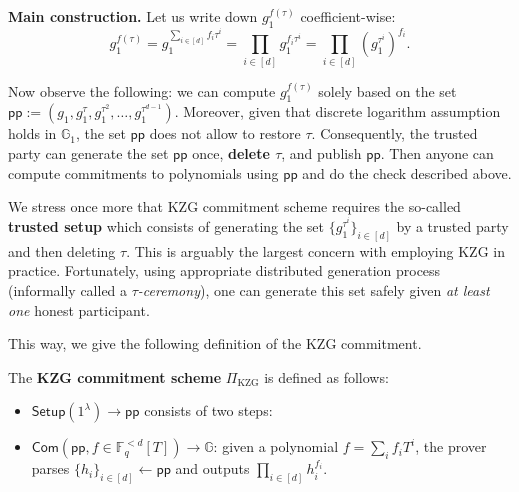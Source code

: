\documentclass[../../book]{subfiles}
\begin{document}
\textbf{Main construction.} Let us write down $g_1^{f(\tau)}$ coefficient-wise:
\begin{equation*}
    g_1^{f(\tau)} = g_1^{\sum_{i \in [d]}f_i\tau^i} = \prod_{i \in [d]}g_1^{f_i\tau^i} = \prod_{i \in [d]}(g_1^{\tau^i})^{f_i}.
\end{equation*}

Now observe the following: we can compute $g_1^{f(\tau)}$ solely based on the set $\mathsf{pp} := (g_1,g_1^{\tau},g_1^{\tau^2},\dots,g_1^{\tau^{d-1}})$.
Moreover, given that discrete logarithm assumption holds in $\mathbb{G}_1$, the set $\mathsf{pp}$ does not allow to restore $\tau$.
Consequently, the trusted party can generate the set $\mathsf{pp}$ once, \textbf{delete $\tau$}, and publish $\mathsf{pp}$.
Then anyone can compute commitments to polynomials using $\mathsf{pp}$ and do the check described above.

\begin{remark}
    We stress once more that KZG commitment scheme requires the so-called \textbf{trusted setup} which consists of generating the set $\{g_1^{\tau^i}\}_{i \in [d]}$ by a trusted party and then deleting $\tau$.
    This is arguably the largest concern with employing KZG in practice.
    Fortunately, using appropriate distributed generation process (informally called a \emph{$\tau$-ceremony}), one can generate this set safely given \textit{at least one} honest participant.
\end{remark}

This way, we give the following definition of the KZG commitment.

\begin{definition}\label{def:kzg-com}
    The \textbf{KZG commitment scheme} $\Pi_{\text{KZG}}$ is defined as follows:
    \begin{itemize}
        \item $\mathsf{Setup}(1^{\lambda}) \to \mathsf{pp}$ consists of two steps: 
        \item $\mathsf{Com}(\mathsf{pp}, f \in \mathbb{F}_q^{<d}[T]) \to \mathbb{G}$: given a polynomial $f = \sum_i f_iT^i$, the prover parses $\{h_i\}_{i \in [d]} \gets \mathsf{pp}$ and outputs $\prod_{i \in [d]} h_i^{f_i}$.
    \end{itemize}
\end{definition}
\end{document}
